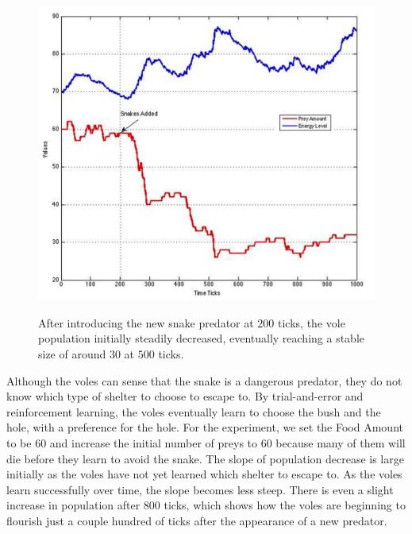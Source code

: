 \documentclass[10pt,conference,letterpaper,doublecolumn]{IEEEtran}
\begin{document}
\begin{figure}[H]
  \centering
  \includegraphics[scale=0.35]{phase2.png} \\
  \caption{After introducing the new snake predator at $200$ ticks, the vole population initially steadily decreased, eventually reaching a stable size of around $30$ at $500$ ticks.}
  \label{p2}
\end{figure}
 Although the voles can sense that the snake is a dangerous predator, they do not know which type of shelter to choose to escape to. By trial-and-error and reinforcement learning, the voles eventually learn to choose the bush and the hole, with a preference for the hole. For the experiment, we set the Food Amount to be 60 and increase the initial number of preys to 60 because many of them will die before they learn to avoid the snake. The slope of population decrease is large initially as the voles have not yet learned which shelter to escape to. As the voles learn successfully over time, the slope becomes less steep. There is even a slight increase in population after 800 ticks, which shows how the voles are beginning to flourish just a couple hundred of ticks after the appearance of a new predator.\\
 
\end{document}
